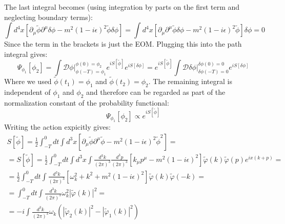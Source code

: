 \documentclass{article}
\begin{document}
The last integral becomes (using integration by parts on the first term and neglecting boundary terms):
\begin{equation}
    \int d^4x \left[
        \partial_\mu\tilde{\phi}\partial^\mu\delta\phi - m^2(1 - i\epsilon)^2\tilde{\phi}\delta\phi
    \right] =
    \int d^4x \left[
        \partial_\mu\partial^\mu\tilde{\phi}\delta\phi - m^2(1 - i\epsilon)^2\tilde{\phi}
    \right]\delta\phi = 0
\end{equation}
Since the term in the brackets is just the EOM. Plugging this into the path integral gives:
\begin{equation}
    \Psi_{\phi_1}[\phi_2] = \int \mathcal{D} \phi \Big|_{\phi(-T) = \phi_1}^{\phi(0) = \phi_2}e^{iS[\tilde{\phi}]}e^{iS[\delta\phi]} = e^{iS[\tilde{\phi}]} \int \mathcal{D} \delta\phi \Big|_{\delta\phi(-T) = 0}^{\delta\phi(0) = 0}e^{iS[\delta\phi]}
\end{equation}
Where we used $\tilde{\phi}(t_1) = \phi_1$ and $\tilde{\phi}(t_2) = \phi_2$. The remaining integral is independent of $\phi_1$ and $\phi_2$ and therefore can be regarded as part of the normalization constant of the probability functional:
\begin{equation}
    \Psi_{\phi_1}[\phi_2] \propto e^{iS[\tilde{\phi}]}
\end{equation}
Writing the action expicitly gives:
\begin{equation}
\begin{gathered}
    S[\tilde{\phi}] = \frac{1}{2}\int_{-T}^0 dt \int d^3x \left[
        \partial_\mu\tilde{\phi}\partial^\mu\tilde{\phi} - m^2(1 - i\epsilon)^2\tilde{\phi}^2
    \right] = \\ =
    S[\tilde{\phi}] = \frac{1}{2}\int_{-T}^0 dt \int d^3x \int \frac{d^3k}{(2\pi)^3}\frac{d^3p}{(2\pi)^3}
    \left[
        k_\mu p^\mu - m^2(1 - i\epsilon)^2
    \right]\tilde{\varphi}(k)\tilde{\varphi}(p)e^{ix(k + p)} = \\ =
    \frac{1}{2}\int_{-T}^0 dt \int \frac{d^3k}{(2\pi)^3}
    \left[
        \omega_k^2 + k^2 + m^2(1 - i\epsilon)^2
    \right]\tilde{\varphi}(k)\tilde{\varphi}(-k) = \\ =
    \int_{-T}^0 dt \int \frac{d^3k}{(2\pi)^3}\omega_k^2
    \left|\tilde{\varphi}(k)\right|^2 = \\ =
    -i\int \frac{d^3k}{(2\pi)^3}\omega_k
    \left(
        \left|\tilde{\varphi}_2(k)\right|^2
        -
        \left|\tilde{\varphi}_1(k)\right|^2
    \right)
\end{gathered}
\end{equation}
\end{document}
